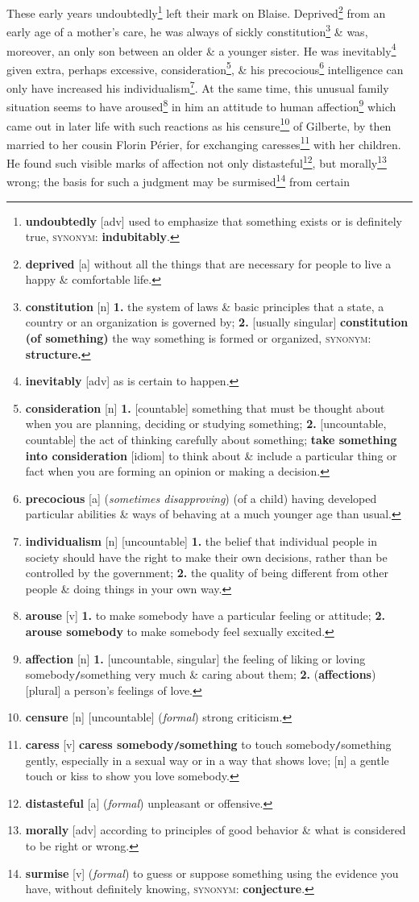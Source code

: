 \documentclass[oneside]{book}
\numberwithin{equation}{section}
\begin{document}
These early years undoubtedly\footnote{\textbf{undoubtedly} [adv] used to emphasize that something exists or is definitely true, \textsc{synonym}: \textbf{indubitably}.} left their mark on Blaise. Deprived\footnote{\textbf{deprived} [a] without all the things that are necessary for people to live a happy \& comfortable life.} from an early age of a mother's care, he was always of sickly constitution\footnote{\textbf{constitution} [n] \textbf{1.} the system of laws \& basic principles that a state, a country or an organization is governed by; \textbf{2.} [usually singular] \textbf{constitution (of something)} the way something is formed or organized, \textsc{synonym}: \textbf{structure.}} \& was, moreover, an only son between an older \& a younger sister. He was inevitably\footnote{\textbf{inevitably} [adv] as is certain to happen.} given extra, perhaps excessive, consideration\footnote{\textbf{consideration} [n] \textbf{1.} [countable] something that must be thought about when you are planning, deciding or studying something; \textbf{2.} [uncountable, countable] the act of thinking carefully about something; \textbf{take something into consideration} [idiom] to think about \& include a particular thing or fact when you are forming an opinion or making a decision.}, \& his precocious\footnote{\textbf{precocious} [a] (\textit{sometimes disapproving}) (of a child) having developed particular abilities \& ways of behaving at a much younger age than usual.} intelligence can only have increased his individualism\footnote{\textbf{individualism} [n] [uncountable] \textbf{1.} the belief that individual people in society should have the right to make their own decisions, rather than be controlled by the government; \textbf{2.} the quality of being different from other people \& doing things in your own way.}. At the same time, this unusual family situation seems to have aroused\footnote{\textbf{arouse} [v] \textbf{1.} to make somebody have a particular feeling or attitude; \textbf{2.} \textbf{arouse somebody} to make somebody feel sexually excited.} in him an attitude to human affection\footnote{\textbf{affection} [n] \textbf{1.} [uncountable, singular] the feeling of liking or loving somebody\texttt{/}something very much \& caring about them; \textbf{2.} (\textbf{affections}) [plural] a person's feelings of love.} which came out in later life with such reactions as his censure\footnote{\textbf{censure} [n] [uncountable] (\textit{formal}) strong criticism.} of Gilberte, by then married to her cousin Florin P\'erier, for exchanging caresses\footnote{\textbf{caress} [v] \textbf{caress somebody\texttt{/}something} to touch somebody\texttt{/}something gently, especially in a sexual way or in a way that shows love; [n] a gentle touch or kiss to show you love somebody.} with her children. He found such visible marks of affection not only distasteful\footnote{\textbf{distasteful} [a] (\textit{formal}) unpleasant or offensive.}, but morally\footnote{\textbf{morally} [adv] according to principles of good behavior \& what is considered to be right or wrong.} wrong; the basis for such a judgment may be surmised\footnote{\textbf{surmise} [v] (\textit{formal}) to guess or suppose something using the evidence you have, without definitely knowing, \textsc{synonym}: \textbf{conjecture}.} from certain 
\end{document}
